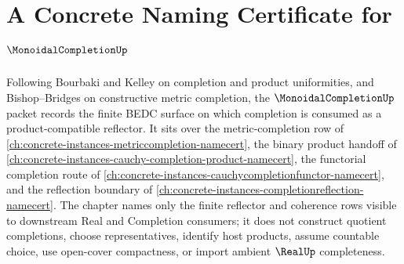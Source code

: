 \chapter{A Concrete Naming Certificate for $\MonoidalCompletionUp$}
\label{ch:concrete-instances-monoidal-completion-namecert}

Following Bourbaki and Kelley on completion and product uniformities, and Bishop--Bridges on constructive metric completion, the $\MonoidalCompletionUp$ packet records the finite BEDC surface on which completion is consumed as a product-compatible reflector. It sits over the metric-completion row of \autoref{ch:concrete-instances-metriccompletion-namecert}, the binary product handoff of \autoref{ch:concrete-instances-cauchy-completion-product-namecert}, the functorial completion route of \autoref{ch:concrete-instances-cauchycompletionfunctor-namecert}, and the reflection boundary of \autoref{ch:concrete-instances-completionreflection-namecert}. The chapter names only the finite reflector and coherence rows visible to downstream Real and Completion consumers; it does not construct quotient completions, choose representatives, identify host products, assume countable choice, use open-cover compactness, or import ambient $\RealUp$ completeness.

